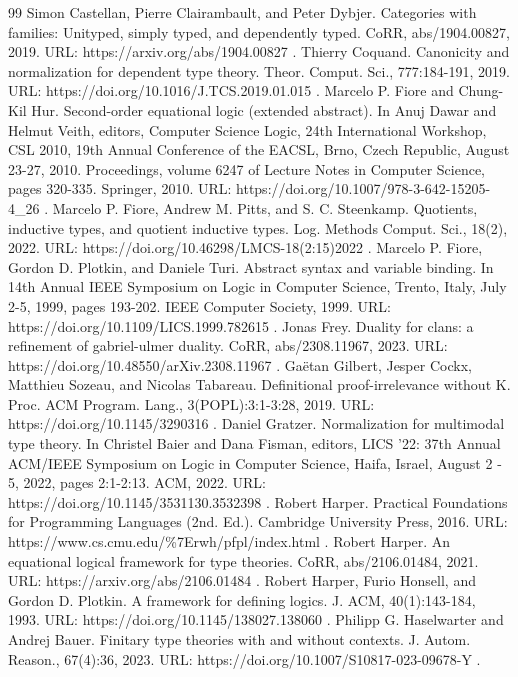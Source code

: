 \begin{thebibliography}{99}
 Simon Castellan, Pierre Clairambault, and Peter Dybjer. Categories with families: Unityped, simply typed, and dependently typed. CoRR, abs/1904.00827, 2019. URL: https://arxiv.org/abs/1904.00827 .
 Thierry Coquand. Canonicity and normalization for dependent type theory. Theor. Comput. Sci., 777:184-191, 2019. URL: https://doi.org/10.1016/J.TCS.2019.01.015 .
 Marcelo P. Fiore and Chung-Kil Hur. Second-order equational logic (extended abstract). In Anuj Dawar and Helmut Veith, editors, Computer Science Logic, 24th International Workshop, CSL 2010, 19th Annual Conference of the EACSL, Brno, Czech Republic, August 23-27, 2010. Proceedings, volume 6247 of Lecture Notes in Computer Science, pages 320-335. Springer, 2010. URL: https://doi.org/10.1007/978-3-642-15205-4\_26 .
 Marcelo P. Fiore, Andrew M. Pitts, and S. C. Steenkamp. Quotients, inductive types, and quotient inductive types. Log. Methods Comput. Sci., 18(2), 2022. URL: https://doi.org/10.46298/LMCS-18(2:15)2022 .
 Marcelo P. Fiore, Gordon D. Plotkin, and Daniele Turi. Abstract syntax and variable binding. In 14th Annual IEEE Symposium on Logic in Computer Science, Trento, Italy, July 2-5, 1999, pages 193-202. IEEE Computer Society, 1999. URL: https://doi.org/10.1109/LICS.1999.782615 .
 Jonas Frey. Duality for clans: a refinement of gabriel-ulmer duality. CoRR, abs/2308.11967, 2023. URL: https://doi.org/10.48550/arXiv.2308.11967 .
 Gaëtan Gilbert, Jesper Cockx, Matthieu Sozeau, and Nicolas Tabareau. Definitional proof-irrelevance without K. Proc. ACM Program. Lang., 3(POPL):3:1-3:28, 2019. URL: https://doi.org/10.1145/3290316 .
 Daniel Gratzer. Normalization for multimodal type theory. In Christel Baier and Dana Fisman, editors, LICS '22: 37th Annual ACM/IEEE Symposium on Logic in Computer Science, Haifa, Israel, August 2 - 5, 2022, pages 2:1-2:13. ACM, 2022. URL: https://doi.org/10.1145/3531130.3532398 .
 Robert Harper. Practical Foundations for Programming Languages (2nd. Ed.). Cambridge University Press, 2016. URL: https://www.cs.cmu.edu/\%7Erwh/pfpl/index.html .
 Robert Harper. An equational logical framework for type theories. CoRR, abs/2106.01484, 2021. URL: https://arxiv.org/abs/2106.01484 .
 Robert Harper, Furio Honsell, and Gordon D. Plotkin. A framework for defining logics. J. ACM, 40(1):143-184, 1993. URL: https://doi.org/10.1145/138027.138060 .
 Philipp G. Haselwarter and Andrej Bauer. Finitary type theories with and without contexts. J. Autom. Reason., 67(4):36, 2023. URL: https://doi.org/10.1007/S10817-023-09678-Y .

\end{thebibliography}
